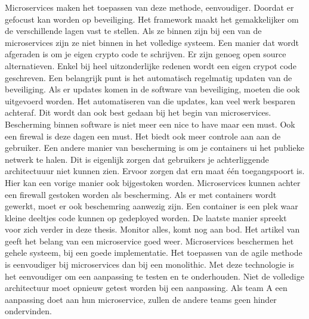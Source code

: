Microservices maken het toepassen van deze methode, eenvoudiger. Doordat er gefocust kan worden op beveiliging. Het framework maakt het gemakkelijker om de verschillende lagen vast te stellen. Als ze binnen zijn bij een van de microservices zijn ze niet binnen in het volledige systeem. 
Een manier dat wordt afgeraden is om je eigen crypto code te schrijven. Er zijn genoeg open source alternatieven. Enkel bij heel uitzonderlijke redenen wordt een eigen crypot code geschreven. 
Een belangrijk punt is het automatisch regelmatig updaten van de beveiliging. Als er updates komen in de software van beveiliging, moeten die ook uitgevoerd worden. Het automatiseren van die updates, kan veel werk besparen achteraf. Dit wordt dan ook best gedaan bij het begin van microservices. Bescherming binnen software is niet meer een nice to have maar een must. Ook een firewal is deze dagen een must. Het biedt ook meer controle aan aan de gebruiker. 
Een andere manier van bescherming is om je containers ui het publieke netwerk te halen. Dit is eigenlijk zorgen dat gebruikers je achterliggende architectuuur niet kunnen zien. Ervoor zorgen dat ern maat één toegangspoort is.  Hier kan een vorige manier ook bijgestoken worden. Microservices kunnen achter een firewall gestoken worden als bescherming. 
Als er met containers wordt gewerkt, moet er ook beschemring aanwezig zijn. Een container is een plek waar kleine deeltjes code kunnen op gedeployed worden. 
De laatste manier spreekt voor zich verder in deze thesis. Monitor alles, komt nog aan bod.
Het artikel van \textcite{Watts2018} geeft het belang van een microservice goed weer. Microservices beschermen het gehele systeem, bij een goede implementatie. Het toepassen van de agile methode is eenvoudiger bij microservices dan bij een monolithic. Met deze technologie is het eenvoudiger om een aanpassing te testen en te onderhouden. Niet de volledige architectuur moet opnieuw getest worden bij een aanpassing. Als team A een aanpassing doet aan hun microservice, zullen de andere teams geen hinder ondervinden. 

